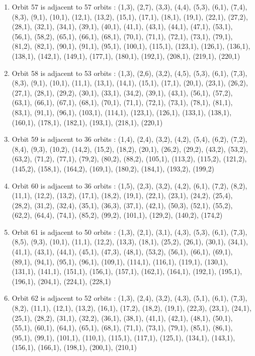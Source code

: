 \documentclass[12pt]{article}
\begin{document}
\begin{enumerate}
\item Orbit 57 is adjacent to 57 orbits : (1,3), (2,7), (3,3), (4,4), (5,3), (6,1), (7,4), (8,3), (9,1), (10,1), (12,1), (13,2), (15,1), (17,1), (18,1), (19,1), (22,1), (27,2), (28,1), (32,1), (34,1), (39,1), (40,1), (41,1), (43,1), (44,1), (47,1), (53,1), (56,1), (58,2), (65,1), (66,1), (68,1), (70,1), (71,1), (72,1), (73,1), (79,1), (81,2), (82,1), (90,1), (91,1), (95,1), (100,1), (115,1), (123,1), (126,1), (136,1), (138,1), (142,1), (149,1), (177,1), (180,1), (192,1), (208,1), (219,1), (220,1)
\item Orbit 58 is adjacent to 53 orbits : (1,3), (2,6), (3,2), (4,5), (5,3), (6,1), (7,3), (8,3), (9,1), (10,1), (11,1), (13,1), (14,1), (15,1), (17,1), (20,1), (23,1), (26,2), (27,1), (28,1), (29,2), (30,1), (33,1), (34,2), (39,1), (43,1), (56,1), (57,2), (63,1), (66,1), (67,1), (68,1), (70,1), (71,1), (72,1), (73,1), (78,1), (81,1), (83,1), (91,1), (96,1), (103,1), (114,1), (123,1), (126,1), (133,1), (138,1), (160,1), (178,1), (182,1), (193,1), (218,1), (220,1)
\item Orbit 59 is adjacent to 36 orbits : (1,4), (2,4), (3,2), (4,2), (5,4), (6,2), (7,2), (8,4), (9,3), (10,2), (14,2), (15,2), (18,2), (20,1), (26,2), (29,2), (43,2), (53,2), (63,2), (71,2), (77,1), (79,2), (80,2), (88,2), (105,1), (113,2), (115,2), (121,2), (145,2), (158,1), (164,2), (169,1), (180,2), (184,1), (193,2), (199,2)
\item Orbit 60 is adjacent to 36 orbits : (1,5), (2,3), (3,2), (4,2), (6,1), (7,2), (8,2), (11,1), (12,2), (13,2), (17,1), (18,2), (19,1), (22,1), (23,1), (24,2), (25,4), (28,2), (31,2), (32,4), (35,1), (36,3), (37,1), (42,1), (50,3), (52,1), (55,2), (62,2), (64,4), (74,1), (85,2), (99,2), (101,1), (129,2), (140,2), (174,2)
\item Orbit 61 is adjacent to 50 orbits : (1,3), (2,1), (3,1), (4,3), (5,3), (6,1), (7,3), (8,5), (9,3), (10,1), (11,1), (12,2), (13,3), (18,1), (25,2), (26,1), (30,1), (34,1), (41,1), (43,1), (44,1), (45,1), (47,3), (48,1), (53,2), (56,1), (66,1), (69,1), (89,1), (94,1), (95,1), (96,1), (109,1), (114,1), (116,1), (119,1), (130,1), (131,1), (141,1), (151,1), (156,1), (157,1), (162,1), (164,1), (192,1), (195,1), (196,1), (204,1), (224,1), (228,1)
\item Orbit 62 is adjacent to 52 orbits : (1,3), (2,4), (3,2), (4,3), (5,1), (6,1), (7,3), (8,2), (11,1), (12,1), (13,2), (16,1), (17,2), (18,2), (19,1), (22,3), (23,1), (24,1), (25,1), (28,2), (31,1), (32,2), (36,1), (38,1), (41,1), (42,1), (48,1), (50,1), (55,1), (60,1), (64,1), (65,1), (68,1), (71,1), (73,1), (79,1), (85,1), (86,1), (95,1), (99,1), (101,1), (110,1), (115,1), (117,1), (125,1), (134,1), (143,1), (156,1), (166,1), (198,1), (200,1), (210,1)

\end{enumerate}
\end{document}
